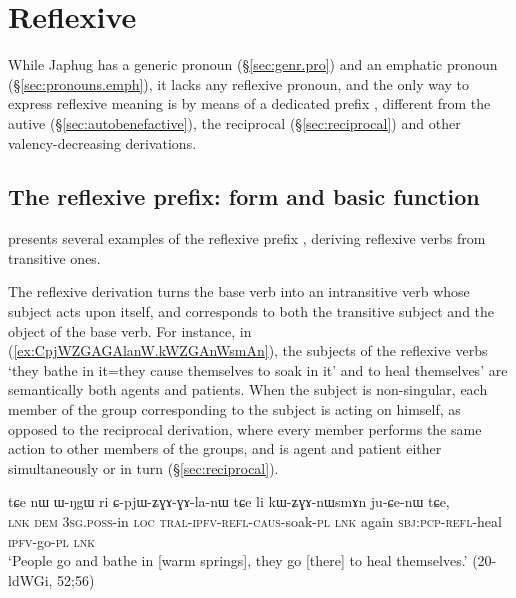 \section{Reflexive} \label{sec:reflexive}
While Japhug has a generic pronoun  (§\ref{sec:genr.pro}) and an emphatic pronoun  (§\ref{sec:pronouns.emph}), it lacks any reflexive pronoun, and the only way to express reflexive meaning is by means of a dedicated prefix , different from the autive (§\ref{sec:autobenefactive}), the reciprocal (§\ref{sec:reciprocal}) and other valency-decreasing derivations.

\subsection{The reflexive prefix: form and basic function}
 presents several examples of the reflexive prefix ,  deriving reflexive verbs from transitive ones.

The reflexive derivation turns the base verb into an intransitive verb whose subject acts upon itself, and corresponds to both the transitive subject and the object of the base verb. For instance, in (\ref{ex:CpjWZGAGAlanW.kWZGAnWsmAn}), the subjects of the reflexive verbs  `they bathe in it=they cause themselves to soak in it' and  to heal themselves' are semantically both agents and patients.  When the subject is non-singular, each member of the group corresponding to the subject is acting on himself, as opposed to the reciprocal derivation, where every member performs the same action to other members of the groups, and is agent and patient either simultaneously or in turn (§\ref{sec:reciprocal}).

\begin{exe}
\ex \label{ex:CpjWZGAGAlanW.kWZGAnWsmAn}
 \gll   %
  tɕe nɯ ɯ-ŋgɯ ri ɕ-pjɯ-ʑɣɤ-ɣɤ-la-nɯ tɕe li kɯ-ʑɣɤ-nɯsmɤn ju-ɕe-nɯ tɕe, \\
\textsc{lnk} \textsc{dem} \textsc{3sg}.\textsc{poss}-in \textsc{loc} \textsc{tral}-\textsc{ipfv}-\textsc{refl}-\textsc{caus}-soak-\textsc{pl} \textsc{lnk} again \textsc{sbj}:\textsc{pcp}-\textsc{refl}-heal \textsc{ipfv}-go-\textsc{pl} \textsc{lnk} \\
\glt `People go and bathe in [warm springs], they go [there] to heal themselves.' (20-ldWGi, 52;56) 
 \end{exe}
  
